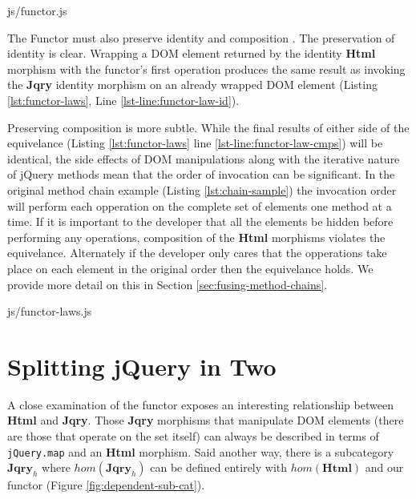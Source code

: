 \documentclass[preprint]{sigplanconf}
\begin{document}
\begin{lstinputlisting}[
    language=JavaScript,
    caption={Functor from Html to Jqry},
    label={lst:functor},
    escapeinside={@}{@}
]{js/functor.js}
\end{lstinputlisting}

The Functor must also preserve identity and composition \cite[p. ~36]{bib:category-definition}. The preservation of identity is clear. Wrapping a DOM element returned by the identity \textbf{Html} morphism with the functor's first operation produces the same result as invoking the \textbf{Jqry} identity morphism on an already wrapped DOM element (Listing \ref{lst:functor-laws}, Line \ref{lst-line:functor-law-id}).

Preserving composition is more subtle. While the final results of either side of the equivelance (Listing \ref{lst:functor-laws} line \ref{lst-line:functor-law-cmps}) will be identical, the side effects of DOM manipulations along with the iterative nature of jQuery methods mean that the order of invocation can be significant. In the original method chain example (Listing \ref{lst:chain-sample}) the invocation order will perform each opperation on the complete set of elements one method at a time.  If it is important to the developer that all the elements be hidden before performing any operations, composition of the \textbf{Html} morphisms violates the equivelance. Alternately if the developer only cares that the opperations take place on each element in the original order then the equivelance holds. We provide more detail on this in Section \ref{sec:fusing-method-chains}.

\begin{lstinputlisting}[
    language=JavaScript,
    caption={Satisfying the Functor Laws},
    label={lst:functor-laws},
    escapeinside={@}{@}
]{js/functor-laws.js}
\vspace{-10pt}
\end{lstinputlisting}

\section{Splitting jQuery in Two}

A close examination of the functor exposes an interesting relationship between \textbf{Html} and \textbf{Jqry}. Those \textbf{Jqry} morphisms that manipulate DOM elements (there are those that operate on the set itself) can always be described in terms of \verb|jQuery.map| and an \textbf{Html} morphism. Said another way, there is a subcategory \begin{math}\mathbf{Jqry}_{h}\end{math} where \begin{math}hom(\mathbf{Jqry}_{h})\end{math} can be defined entirely with \begin{math}hom(\mathbf{Html})\end{math} and our functor (Figure \ref{fig:dependent-sub-cat}).
\end{document}
